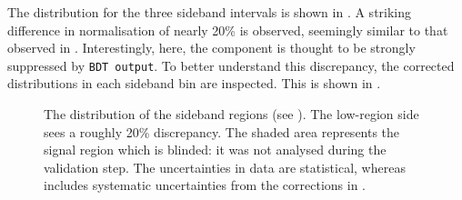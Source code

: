 The \EB distribution for the three \EB sideband intervals is shown in .
A striking difference in normalisation of nearly 20\% is observed, 
seemingly similar to that observed in .
Interestingly, here, the \epem\ra\qqbar component is thought to be strongly suppressed by \texttt{BDT~output}.
To better understand this discrepancy, the corrected \Mbc distributions in each \EB sideband bin are inspected.
This is shown in .
\begin{figure}[hbtp!]
    \centering
    \caption{\label{fig:sidebands_eb} 
    The \EB distribution of the \EB sideband regions (see ).
    The low-\EB region side sees a roughly 20\% discrepancy.
    The shaded area represents the signal region which is blinded: it was not analysed during the validation step.
    The uncertainties in data are statistical, whereas \MC includes systematic uncertainties from the corrections in .
    }
\end{figure}

